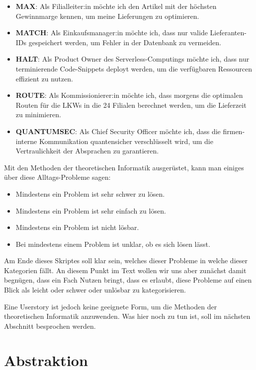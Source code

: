\begin{itemize}
    \item \textbf{MAX}: Als Filialleiter:in möchte ich den Artikel mit der höchsten Gewinnmarge
        kennen, um meine Lieferungen zu optimieren.
    \item \textbf{MATCH}: Als Einkaufsmanager:in möchte ich,
        dass nur valide Lieferanten-IDs gespeichert werden,
        um Fehler in der Datenbank zu vermeiden.
    \item \textbf{HALT}: Als Product Owner des Serverless-Computings möchte ich,
        dass nur terminierende Code-Snippets deployt werden,
        um die verfügbaren Ressourcen effizient zu nutzen.
    \item \textbf{ROUTE}: Als Kommissionierer:in möchte ich,
        dass morgens die optimalen Routen für die LKWs in die 24 Filialen berechnet werden,
        um die Lieferzeit zu minimieren.
    \item \textbf{QUANTUMSEC}: Als Chief Security Officer möchte ich,
        dass die firmen-interne Kommunikation quantensicher verschlüsselt wird,
        um die Vertraulichkeit der Absprachen zu garantieren.
\end{itemize}

Mit den Methoden der theoretischen Informatik ausgerüstet,
kann man einiges über diese Alltags-Probleme sagen:
\begin{itemize}
    \item Mindestens ein Problem ist sehr schwer zu lösen.
    \item Mindestens ein Problem ist sehr einfach zu lösen.
    \item Mindestens ein Problem ist nicht lösbar.
    \item Bei mindestens einem Problem ist unklar, ob es sich lösen lässt.
\end{itemize}

Am Ende dieses Skriptes soll klar sein, welches dieser Probleme in welche dieser Kategorien fällt.
An diesem Punkt im Text wollen wir uns aber zunächst damit begnügen,
dass ein Fach Nutzen bringt, dass es erlaubt, diese Probleme auf einen Blick als leicht oder
schwer oder unlösbar zu kategorisieren.

Eine Userstory ist jedoch keine geeignete Form,
um die Methoden der theoretischen Informatik anzuwenden.
Was hier noch zu tun ist, soll im nächsten Abschnitt besprochen werden.

\section{Abstraktion}


